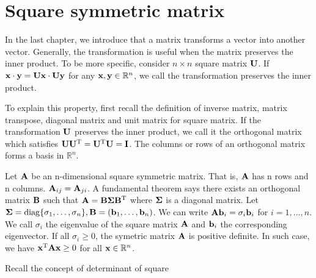 \section{Square symmetric matrix}
In the last chapter, we introduce that a matrix transforms a vector into another vector. Generally, the transformation is useful when the matrix preserves the inner product. To be more specific, consider $ n \times n $ square matrix $\mathbf{U}$. If $ \mathbf{x} \cdot \mathbf{y} =  \mathbf{U}\mathbf{x} \cdot \mathbf{U}\mathbf{y}$ for any $\mathbf{x}, \mathbf{y} \in \mathbb{R}^n$, we call the transformation preserves the inner product.

To explain this property, first recall the definition of inverse matrix, matrix transpose, diagonal matrix and unit matrix for square matrix. If the transformation $\mathbf{U}$ preserves the inner product, 
we call it the orthogonal matrix which satisfies $\mathbf{U}\mathbf{U}^{\mathrm{T}} = \mathbf{U}^{\mathrm{T}}\mathbf{U}= \mathbf{I}$. The columns or rows of an orthogonal matrix forms a basis in $\mathbb{R}^n$.

Let $\mathbf{A}$ be an n-dimensional square symmetric matrix. That is, $\mathbf{A}$ has n rows and n columns. $\mathbf{A}_{ij} = \mathbf{A}_{ji}$. A fundamental theorem says there exists an orthogonal matrix $\mathbf{B}$ such that 
$\mathbf{A} = \mathbf{B} \mathbf{\Sigma} \mathbf{B}^{\mathrm{T}}$ where $\mathbf{\Sigma}$ is a diagonal matrix. Let $ \mathbf{\Sigma} = \operatorname{diag}\{ \sigma_1, \dots, \sigma_n \}, \mathbf{B} =  (\mathbf{b}_1, \dots, \mathbf{b}_n)$. We can write $\mathbf{A} \mathbf{b}_i = \sigma_i\mathbf{b}_i $ for $i=1, \dots, n $. We call $\sigma_i$ the eigenvalue of the square matrix $\mathbf{A}$ and $\mathbf{b}_i$ the corresponding eigenvector. If all $\sigma_i \geq 0$, the symetric matrix $\mathbf{A}$ is positive definite. In such case, we have $\mathbf{x}^{\mathrm{T}} \mathbf{A} \mathbf{x} \geq 0$ for all $\mathbf{x} \in \mathbb{R}^n$.

Recall the concept of determinant of square 

